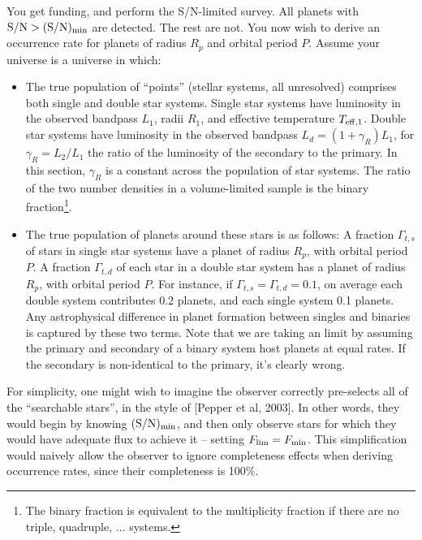\documentclass{emulateapj}
\begin{document}
You get funding, and perform the S/N-limited survey. All planets with 
${\rm S/N} > {\rm (S/N)_{min}}$ are detected. The rest are not.
You now wish to derive an occurrence rate for planets of radius $R_p$ and 
orbital period $P$.
Assume your universe is a universe in which:
\begin{itemize}
	\item The true population of ``points'' (stellar systems, all unresolved) 
	comprises both single and double star systems. Single star systems have 
	luminosity in the observed bandpass $L_1$, radii $R_1$, and effective 
	temperature $T_{\rm eff,1}$.
	Double star systems have luminosity in the observed bandpass $L_d = 
	(1+\gamma_R)L_1$, for $\gamma_R = L_2/L_1$ the ratio of the luminosity of 
	the secondary to the primary. 
	In this section, $\gamma_R$ is a constant across the population 
	of star systems.
	The ratio of the two number densities in a 
	volume-limited sample is the binary fraction\footnote{The binary fraction 
		is equivalent to the multiplicity fraction if there are no triple, 
		quadruple, $\ldots$ systems.}.
	\item The true population of planets around these stars is as follows:
	\subitem A fraction $\Gamma_{t,s}$ of stars in single star systems 
	have a planet of radius $R_p$, with orbital period $P$.
	\subitem A fraction $\Gamma_{t,d}$ of each star in a double star 
	system has a planet of radius $R_p$, with orbital period $P$. For instance, 
	if $\Gamma_{t,s} = \Gamma_{t,d} = 0.1$, on average each double 
	system contributes 0.2 planets, and each single system 0.1 planets.
	Any astrophysical difference in planet formation between singles and 
	binaries is captured by these two terms.
	Note that we are taking an limit by assuming the primary and secondary of 
	a binary system host planets at equal rates. If the secondary is 
	non-identical to the primary, it's clearly wrong.	
\end{itemize}



For simplicity, one might wish to imagine the observer correctly 
pre-selects all of the ``searchable stars'', in the style of [Pepper et al, 
2003].
In other words, they would begin by knowing ${\rm (S/N)_{min}}$, and then only 
observe stars for which they would have adequate flux to achieve it -- setting 
$F_{\rm lim} = F_{\rm min}$.
This simplification would naively allow the observer to ignore 
completeness effects when deriving occurrence rates, since their completeness 
is 100\%.
\end{document}
